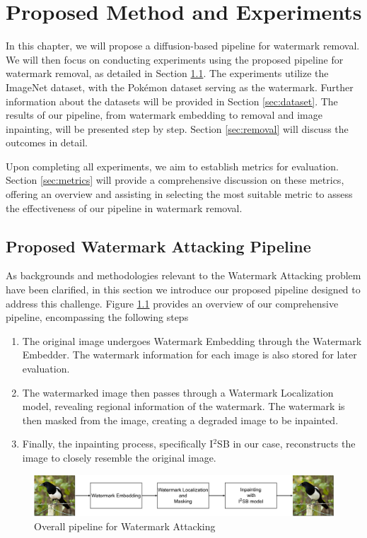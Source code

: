\chapter{Proposed Method and Experiments}
\label{chap:experiment}
\thispagestyle{empty}
In this chapter, we will propose a diffusion-based pipeline for watermark removal. We will then focus on conducting experiments using the proposed pipeline for watermark removal, as detailed in Section \ref{sec:pipeline}. The experiments utilize the ImageNet dataset, with the Pokémon dataset serving as the watermark. Further information about the datasets will be provided in Section \ref{sec:dataset}. The results of our pipeline, from watermark embedding to removal and image inpainting, will be presented step by step. Section \ref{sec:removal} will discuss the outcomes in detail.

Upon completing all experiments, we aim to establish metrics for evaluation. Section \ref{sec:metrics} will provide a comprehensive discussion on these metrics, offering an overview and assisting in selecting the most suitable metric to assess the effectiveness of our pipeline in watermark removal.

\section{Proposed Watermark Attacking Pipeline}
\label{sec:pipeline}
As backgrounds and methodologies relevant to the Watermark Attacking problem have been clarified, in this section we introduce our proposed pipeline designed to address this challenge. Figure \ref{figure:overall_pipeline} provides an overview of our comprehensive pipeline, encompassing the following steps
\begin{enumerate}
 \item The original image undergoes Watermark Embedding through the Watermark Embedder. The watermark information for each image is also stored for later evaluation.
 \item The watermarked image then passes through a Watermark Localization model, revealing regional information of the watermark. The watermark is then masked from the image, creating a degraded image to be inpainted.
 \item Finally, the inpainting process, specifically I$^2$SB in our case, reconstructs the image to closely resemble the original image.
\end{enumerate}
\begin{figure}[t]
 \centering
 \includegraphics[width = \textwidth]{img/overall.png}
 \caption{Overall pipeline for Watermark Attacking}
 \label{figure:overall_pipeline}
\end{figure}

